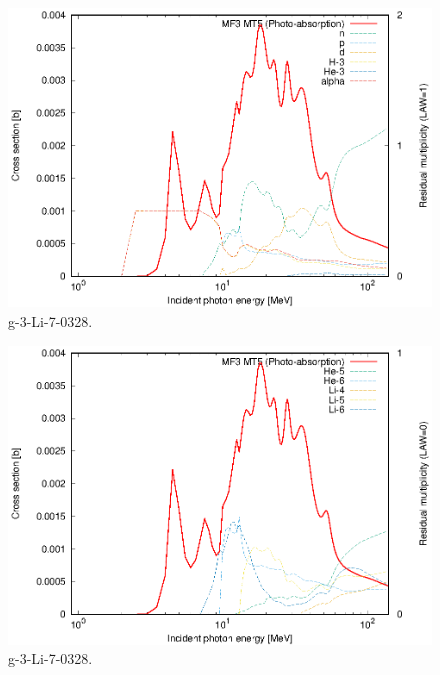 \begin{figure}
 \includegraphics[width=\linewidth]{eps/g_3-Li-7_0328.eps}
  \caption{g-3-Li-7-0328.}
\end{figure}
\begin{figure}
 \includegraphics[width=\linewidth]{eps-law0/g_3-Li-7_0328.eps}
 \caption{g-3-Li-7-0328.}
\end{figure}
\newpage \clearpage

